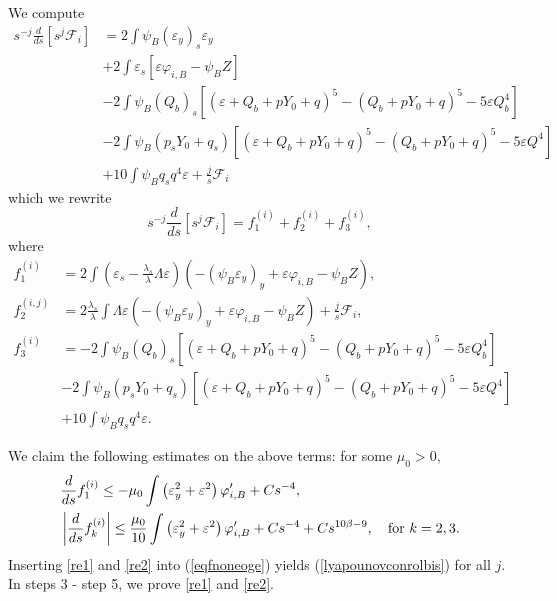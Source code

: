 \documentclass[11pt,a4paper,reqno]{amsart}
\theoremstyle{remark}
\numberwithin{equation}{section}
\newcommand{\be}{\begin{equation}}
\newcommand{\ee}{\end{equation}}
\def\fref#1{{\rm (\ref{#1})}}
\def\e{\varepsilon}
\def\fref#1{{\rm (\ref{#1})}}
\def\cal{\mathcal}
\def\Yz{Y_0}
\begin{document}
We compute
\begin{align*}
  s^{-j} \frac d{d{s}}\left[ s^j {\cal F_{i}} \right]  &=
 2\int \psi_B(\varepsilon_y)_s \varepsilon_y\\
 & + 2\int \varepsilon_s \left[ \varepsilon \varphi_{i,B} - \psi_B Z\right]\\
&  -2 \int \psi_B(Q_b)_s \left[(\varepsilon+Q_b+p\Yz+q)^5 - (Q_b+p\Yz+q)^5 - 5 \varepsilon Q_b^4\right]\\
& - 2 \int \psi_B (p_s \Yz+ q_s) \left[(\varepsilon+Q_b+p\Yz+q)^5 -(Q_b+p\Yz+q)^5  - 5 \varepsilon Q^4\right]
\\& + 10 \int \psi_B q_s q^4 \e + \frac j s \mathcal F_{i}
\end{align*}
which we rewrite 
\be
\label{eqfnoneoge}
 s^{-j} \frac d{d{s}}\left[ s^j {\cal F_{i}} \right]  =  f^{(i)}_{1}+f^{(i)}_2+f^{(i)}_3,
 \ee
  where 
{\allowdisplaybreaks
\begin{align*}
  f^{(i)}_{1} &=
      2 \int \left( \varepsilon_{s} - {\frac{{\lambda}_s}{{\lambda}}} {\Lambda} \varepsilon\right) \left( - (\psi_B\e_y)_{y} + \varepsilon \varphi_{i,B} -\psi_BZ\right) ,\\
f^{(i,j)}_2  &= 
 2 {\frac{{\lambda}_s}{{\lambda}}}  \int    {\Lambda} \varepsilon  \left( - (\psi_B\varepsilon_y)_y +  \varepsilon\varphi_{i,B} -\psi_B Z \right) +\frac js\mathcal F_{i}, \\
 f^{(i)}_3 &= 
  - 2  \int \psi_B(Q_b)_{s} \left[(\varepsilon+Q_b+p\Yz+q)^5 - (Q_b+p\Yz+q)^5 - 5 \varepsilon Q_b^4\right]\\
& - 2 \int \psi_B (p_s \Yz+ q_s) \left[(\varepsilon+Q_b+p\Yz+q)^5  -(Q_b+p\Yz+q)^5 - 5 \varepsilon Q^4\right]\\
&+ 10 \int \psi_B q_s q^4 \e.
\end{align*}
}

We claim the following estimates on the above terms: for some $\mu_0>0$,  
\begin{align}
\label{re1}
& \frac{d }{ds} f^{(i)}_{1}\leq - \mu_0  \int   \left(\varepsilon_y^2+\e^2\right)   \varphi'_{i,B}  + 
 C s^{-4},
\\  
\label{re2}
& \left|\frac{d }{ds} f^{(i)}_{k}\right|\leq \frac {\mu_0}{10}    \int   \left(\varepsilon_y^2+\e^2\right)   \varphi'_{i,B}  +  C s^{-4}+  C s^{10\beta -9}, \quad \hbox{for $k=2,3.$}
\end{align}
  Inserting \eqref{re1} and \eqref{re2} into \fref{eqfnoneoge}   yields \fref{lyapounovconrolbis}
  for all $j$.
In steps 3 - step 5, we prove \eqref{re1} and \eqref{re2}.
\end{document}
